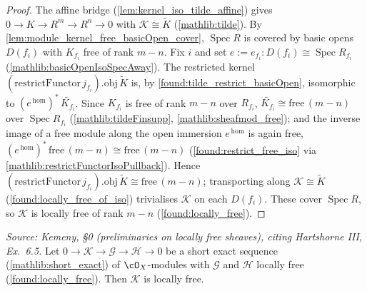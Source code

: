 \begin{proof}
  The affine bridge (\cref{lem:kernel_iso_tilde_affine}) gives
  \(0\to K\to R^m\to R^n\to 0\) with \(\mathcal K\cong\widetilde K\)
  (\cref{mathlib:tilde}).  By \cref{lem:module_kernel_free_basicOpen_cover},
  \(\operatorname{Spec}R\) is covered by basic opens \(D(f_i)\) with \(K_{f_i}\) free
  of rank \(m-n\).  Fix \(i\) and set \(e:=e_{f_i}:D(f_i)\cong\operatorname{Spec}
  R_{f_i}\) (\cref{mathlib:basicOpenIsoSpecAway}).  The restricted kernel
  \((\mathrm{restrictFunctor}\,j_{f_i}).\mathrm{obj}\,\widetilde K\) is, by
  \cref{found:tilde_restrict_basicOpen}, isomorphic to
  \((e^{\,\mathrm{hom}})^{*}\,\widetilde{K_{f_i}}\).  Since \(K_{f_i}\) is free of
  rank \(m-n\) over \(R_{f_i}\), \(\widetilde{K_{f_i}}\cong\mathrm{free}\,(m-n)\)
  over \(\operatorname{Spec}R_{f_i}\) (\cref{mathlib:tildeFinsupp},
  \cref{mathlib:sheafmod_free}); and the inverse image of a free module along the
  open immersion \(e^{\,\mathrm{hom}}\) is again free,
  \((e^{\,\mathrm{hom}})^{*}\,\mathrm{free}\,(m-n)\cong\mathrm{free}\,(m-n)\)
  (\cref{found:restrict_free_iso} via \cref{mathlib:restrictFunctorIsoPullback}).
  Hence \((\mathrm{restrictFunctor}\,j_{f_i}).\mathrm{obj}\,\widetilde K\cong
  \mathrm{free}\,(m-n)\); transporting along \(\mathcal K\cong\widetilde K\)
  (\cref{found:locally_free_of_iso}) trivialises \(\mathcal K\) on each \(D(f_i)\).
  These cover \(\operatorname{Spec}R\), so \(\mathcal K\) is locally free of rank
  \(m-n\) (\cref{found:locally_free}).
\end{proof}

\begin{lemma}
  \label{found:isLocallyFree_kernel_of_shortExact}
  \textit{Source: Kemeny, \S0 (preliminaries on locally free sheaves), citing
  Hartshorne III, Ex.~6.5.}
  Let \(0\to\mathcal K\to\mathcal G\to\mathcal H\to 0\) be a short exact sequence
  (\cref{mathlib:short_exact}) of \(\cO_X\)-modules with \(\mathcal G\) and
  \(\mathcal H\) locally free (\cref{found:locally_free}).  Then \(\mathcal K\) is
  locally free.
\end{lemma}

